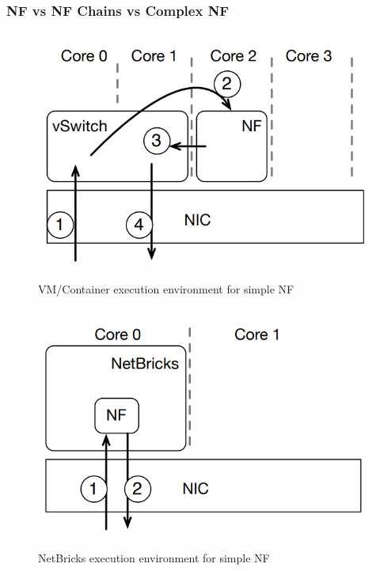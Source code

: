 \documentclass[10pt, a4paper, conference]{IEEEtran}
\begin{document}
\subsubsection*{NF vs NF Chains vs Complex NF}
\begin{figure}
	\centering
	\includegraphics[width=\linewidth]{figures/fig6}
	\caption{VM/Container execution environment for simple NF}
	\cite{Panda2016}
	\label{key8}
\end{figure}
\begin{figure}
	\centering
	\includegraphics[width=\linewidth]{figures/fig7}
	\caption{NetBricks execution environment for simple NF}
	\cite{Panda2016}
	\label{key9}
\end{figure}
\end{document}
